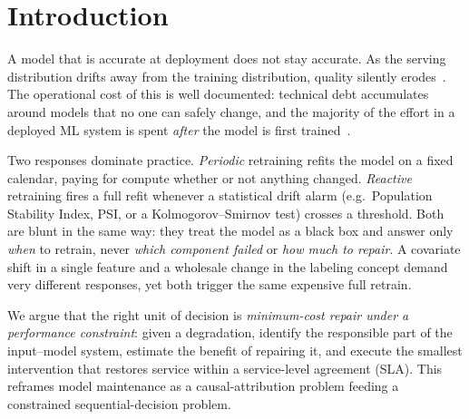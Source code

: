 \documentclass[conference]{IEEEtran}
\begin{document}
\section{Introduction}
A model that is accurate at deployment does not stay accurate. As the
serving distribution drifts away from the training distribution, quality
silently erodes~\cite{gama2014survey,lu2018learning,quinonero2009dataset}.
The operational cost of this is well documented: technical debt
accumulates around models that no one can safely change, and the majority
of the effort in a deployed ML system is spent \emph{after} the model is
first trained~\cite{sculley2015debt,paleyes2022challenges}.

Two responses dominate practice. \emph{Periodic} retraining refits the
model on a fixed calendar, paying for compute whether or not anything
changed. \emph{Reactive} retraining fires a full refit whenever a
statistical drift alarm (e.g.\ Population Stability Index, PSI, or a
Kolmogorov--Smirnov test) crosses a threshold. Both are blunt in the same
way: they treat the model as a black box and answer only \emph{when} to
retrain, never \emph{which component failed} or \emph{how much to repair}. A
covariate shift in a single feature and a wholesale change in the labeling
concept demand very different responses, yet both trigger the same
expensive full retrain.

We argue that the right unit of decision is \emph{minimum-cost repair
under a performance constraint}: given a degradation, identify the
responsible part of the input--model system, estimate the benefit of
repairing it, and execute the smallest intervention that restores service
within a service-level agreement (SLA). This reframes model maintenance as
a causal-attribution problem feeding a constrained sequential-decision
problem.
\end{document}
